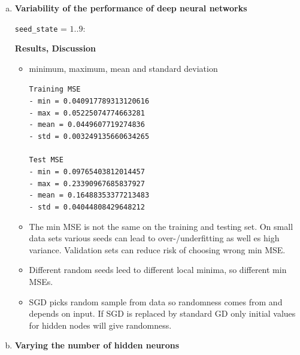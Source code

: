 \documentclass[12pt,a4paper]{article}
\begin{document}
\begin{enumerate}[a)]

  \item \textbf{Variability of the performance of deep neural networks}

\texttt{seed\_state} = $1..9$:

\textbf{Results, Discussion}

\begin{itemize}
  \item minimum, maximum, mean and standard deviation

\texttt{Training MSE \\
- min = 0.040917789313120616 \\
- max = 0.05225074774663281 \\
- mean = 0.0449607719274836 \\
- std = 0.003249135660634265 \\
\\
Test MSE \\
- min = 0.09765403812014457 \\
- max = 0.23390967685837927 \\
- mean = 0.16488353377213483 \\
- std = 0.04044808429648212\\
}

  \item The min MSE is not the same on the training and testing set.  On small
  data sets various seeds can lead to over-/underfitting as well es high
  variance. Validation sets can reduce risk of choosing wrong min MSE.
  \item Different random seeds leed to different local minima, so different min
  MSEs.
  \item SGD picks random sample from data so randomness comes from and depends
  on input. If SGD is replaced by standard GD only initial values for hidden
  nodes will give randomness.
\end{itemize}


  \item \textbf{Varying the number of hidden neurons}
  

\end{enumerate}
\end{document}
